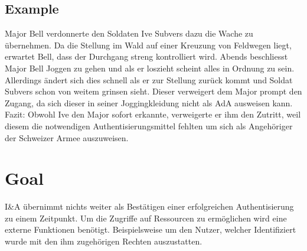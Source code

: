 \subsection{Example}
Major Bell verdonnerte den Soldaten Ive Subvers dazu die Wache zu übernehmen. Da die Stellung im Wald auf einer Kreuzung von Feldwegen liegt, erwartet Bell, dass der Durchgang streng kontrolliert wird. Abends beschliesst Major Bell Joggen zu gehen und als er loszieht scheint alles in Ordnung zu sein. Allerdings ändert sich dies schnell als er zur Stellung zurück kommt und Soldat Subvers schon von weitem grinsen sieht. Dieser verweigert dem Major prompt den Zugang, da sich dieser in seiner Joggingkleidung nicht als AdA ausweisen kann. Fazit: Obwohl Ive den Major sofort erkannte, verweigerte er ihm den Zutritt, weil diesem die notwendigen Authentisierungsmittel fehlten um sich als Angehöriger der Schweizer Armee auszuweisen.

\section{Goal}
I\&A übernimmt nichts weiter als Bestätigen einer erfolgreichen Authentisierung zu einem Zeitpunkt. Um die Zugriffe auf Ressourcen zu ermöglichen wird eine externe Funktionen benötigt. Beispielsweise um den Nutzer, welcher Identifiziert wurde mit den ihm zugehörigen Rechten auszustatten.

